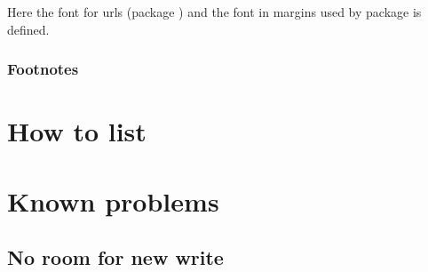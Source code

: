 Here the font for urls (package ) and the font in margins used by package  is defined.


\subsection{Footnotes}


\chapter{How to list}

\chapter{Known problems}

\section{No room for new write}
\label{sec:problems:write}